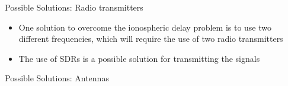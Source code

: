 \begin{frame}{Possible Solutions: Radio transmitters}

    \begin{itemize}
        \item One solution to overcome the ionospheric delay problem is to use two different frequencies, which will require the use of two radio transmitters
        \vspace{0.2cm}
        \item The use of SDRs is a possible solution for transmitting the signals
    \end{itemize}

\end{frame}

\begin{frame}{Possible Solutions: Antennas}


\end{frame}
